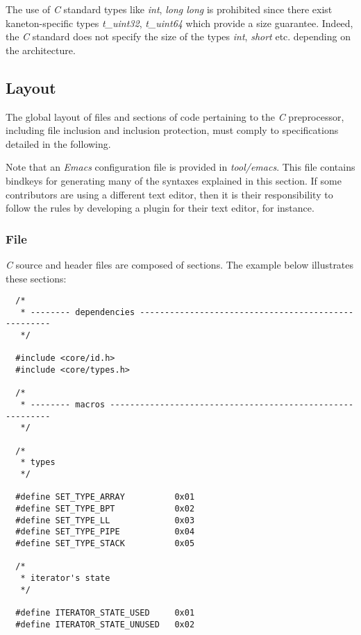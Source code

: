 The use of \textit{C} standard types like \textit{int}, \textit{long long}
is prohibited since there exist kaneton-specific types \textit{t\_uint32},
\textit{t\_uint64} which provide a size guarantee. Indeed, the \textit{C}
standard does not specify the size of the types \textit{int}, \textit{short}
etc. depending on the architecture.

%
%

\subsection{Layout}

The global layout of files and sections of code pertaining to the \textit{C}
preprocessor, including file inclusion and inclusion protection, must
comply to specifications detailed in the following.

Note that an \textit{Emacs} configuration file is provided in
\textit{tool/emacs}. This file contains bindkeys for generating many of
the syntaxes explained in this section. If some contributors are using
a different text editor, then it is their responsibility to follow the rules
by developing a plugin for their text editor, for instance.


\subsubsection{File}

\textit{C} source and header files are composed of sections. The example
below illustrates these sections:

\begin{verbatim}
  /*
   * -------- dependencies ----------------------------------------------------
   */

  #include <core/id.h>
  #include <core/types.h>

  /*
   * -------- macros ----------------------------------------------------------
   */

  /*
   * types
   */

  #define SET_TYPE_ARRAY          0x01
  #define SET_TYPE_BPT            0x02
  #define SET_TYPE_LL             0x03
  #define SET_TYPE_PIPE           0x04
  #define SET_TYPE_STACK          0x05

  /*
   * iterator's state
   */

  #define ITERATOR_STATE_USED     0x01
  #define ITERATOR_STATE_UNUSED   0x02
\end{verbatim}

